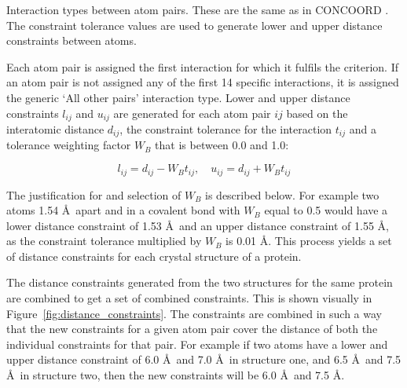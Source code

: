 \begin{table}
\caption[Interaction types between atom pairs in ExProSE]
{Interaction types between atom pairs.
These are the same as in CONCOORD \cite{DeGroot1997}.
The constraint tolerance values are used to generate lower and upper distance constraints between atoms.}

\label{tab:interaction_types}
\end{table}


Each atom pair is assigned the first interaction for which it fulfils the criterion.
If an atom pair is not assigned any of the first 14 specific interactions, it is assigned the generic `All other pairs' interaction type.
Lower and upper distance constraints $l_{ij}$ and $u_{ij}$ are generated for each atom pair $ij$ based on the interatomic distance $d_{ij}$, the constraint tolerance for the interaction $t_{ij}$ and a tolerance weighting factor $W_{B}$ that is between 0.0 and 1.0:

$$
l_{ij} = d_{ij} - W_{B} t_{ij}, \quad u_{ij} = d_{ij} + W_{B} t_{ij}
$$

The justification for and selection of $W_{B}$ is described below.
For example two atoms 1.54 \AA\ apart and in a covalent bond with $W_{B}$ equal to 0.5 would have a lower distance constraint of 1.53 \AA\ and an upper distance constraint of 1.55 \AA, as the constraint tolerance multiplied by $W_{B}$ is 0.01 \AA.
This process yields a set of distance constraints for each crystal structure of a protein.

The distance constraints generated from the two structures for the same protein are combined to get a set of combined constraints.
This is shown visually in Figure~\ref{fig:distance_constraints}.
The constraints are combined in such a way that the new constraints for a given atom pair cover the distance of both the individual constraints for that pair.
For example if two atoms have a lower and upper distance constraint of 6.0 \AA\ and 7.0 \AA\ in structure one, and 6.5 \AA\ and 7.5 \AA\ in structure two, then the new constraints will be 6.0 \AA\ and 7.5 \AA.


